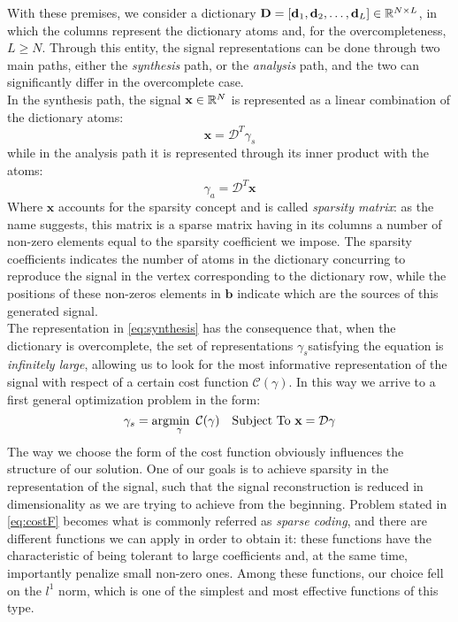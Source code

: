 With these premises, we consider a dictionary $\textbf{D} = [\textbf{d}_1, \textbf{d}_2, \dots, \textbf{d}_L] \in \mathbb{R}^{N \times L}$, in which the columns represent the dictionary atoms and, for the overcompleteness, $L\geq N$. Through this entity, the signal representations can be done through two main paths, either the \textit{synthesis} path, or the \textit{analysis} path, and the two can significantly differ in the overcomplete case.\\
In the synthesis path, the signal $\textbf{x} \in \mathbb{R}^N$ is represented as a linear combination of the dictionary atoms:
\begin{equation}
\textbf{x} = \mathcal{D}^T \gamma_s
\label{eq:synthesis}
\end{equation}
while in the analysis path it is represented through its inner product with the atoms:
\begin{equation}
\gamma_a = \mathcal{D}^T \textbf{x}
\label{eq:analysis}
\end{equation}
Where $\textbf{x}$ accounts for the sparsity concept and is called \textit{sparsity matrix}: as the name suggests, this matrix is a sparse matrix having in its columns a number of non-zero elements equal to the sparsity coefficient we impose. The sparsity coefficients indicates the number of atoms in the dictionary concurring to reproduce the signal in the vertex corresponding to the dictionary row, while the positions of these non-zeros elements in $\textbf{b}$ indicate which are the sources of this generated signal.\\

The representation in \autoref{eq:synthesis} has the consequence that, when the dictionary is overcomplete, the set of representations $\gamma_s$satisfying the equation is \textit{infinitely large}, allowing us to look for the most informative representation of the signal with respect of a certain cost function $\mathcal{C}(\gamma)$. In this way we arrive to a first general optimization problem in the form:
\begin{equation}
\gamma_s = \arg\!\min_{\gamma} \text{  } \mathcal{C}(\gamma) \quad \text{Subject To  } \textbf{x} = \mathcal{D}\textbf{$\gamma$}
\label{eq:costF}
\end{equation}
The way we choose the form of the cost function obviously influences the structure of our solution. One of our goals is to achieve sparsity in the representation of the signal, such that the signal reconstruction is reduced in dimensionality as we are trying to achieve from the beginning. Problem stated in \autoref{eq:costF} becomes what is commonly referred as \textit{sparse coding}, and there are different functions we can apply in order to obtain it: these functions have the characteristic of being tolerant to large coefficients and, at the same time, importantly penalize small non-zero ones. Among these functions, our choice fell on the $l^1$ norm, which is one of the simplest and most effective functions of this type.

